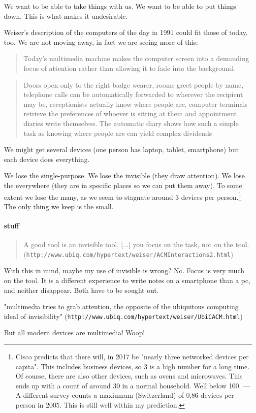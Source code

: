 We want to be able to take things with us. We want to be able to put things down. This is what makes it undesirable.

Weiser's description of the computers of the day in 1991 could fit those of today, too. We are not moving away, in fact we are
seeing more of this:

\begin{quote}
    Today's multimedia machine makes the computer screen into a demanding focus of attention rather than allowing it to fade
    into the background.\cite{weiser91}
\end{quote}

\begin{quote}
    Doors open only to the right badge wearer, rooms greet people by name, telephone calls can be automatically forwarded to wherever the recipient may be, receptionists actually know where people are, computer terminals retrieve the preferences of whoever is sitting at them and appointment diaries write themselves. The automatic diary shows how such a simple task as knowing where people are can yield complex dividends\cite{weiser91}
\end{quote}

We might get several devices (one person has laptop, tablet, smartphone) but each device does everything.

We lose the single-purpose. We lose the invisible (they draw attention). We lose the everywhere (they are in specific places
so we can put them away). To some extent we lose the many, as we seem to stagnate around 3 devices per person.\footnote{Cisco
predicts that there will, in 2017 be "nearly three networked devices per capita". This includes business devices, so 3 is a
high number for a long time.\cite{cisco} Of course, there are also other devices, such as ovens and microwaves. This ends up
with a count of around 30 in a normal household. Well below 100. --- A different survey counts a maxiumum (Switzerland) of
0,86 devices per person in 2005. This is still well within my prediction.\cite{nationmaster}} The only thing we keep is the small.

\paragraph{stuff}

\begin{quote}
    A good tool is an invisible tool. [...] you focus on the task, not on the tool. (\verb+http://www.ubiq.com/hypertext/weiser/ACMInteractions2.html+)
\end{quote}

With this in mind, maybe my use of invisible is wrong? No. Focus is very much on the tool. It is a different experience to write notes on
a smartphone than a pc, and neither disappear. Both have to be sought out.

"multimedia tries to grab attention, the opposite of the ubiquitous computing ideal of invisibility" (\verb+http://www.ubiq.com/hypertext/weiser/UbiCACM.html+)

But all modern devices are multimedia! Woop!